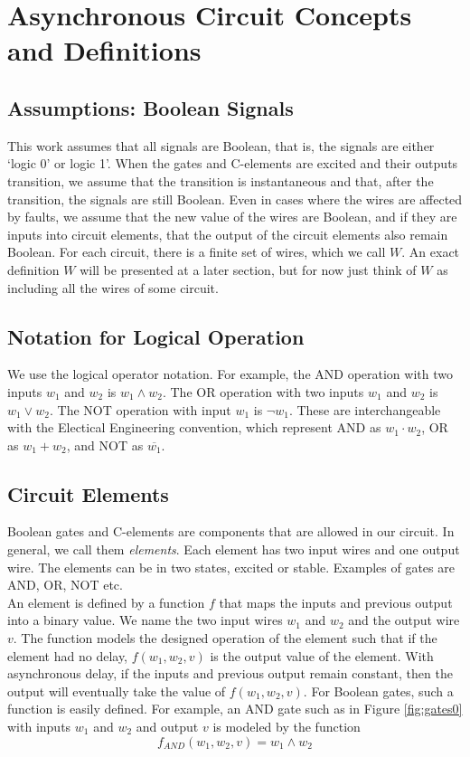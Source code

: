 \documentclass[12pt]{report}
\begin{document}
\chapter{Asynchronous Circuit Concepts and Definitions}
\section{Assumptions:  Boolean Signals}
This work assumes that all signals are Boolean, that is, the signals are either `logic 0' or logic 1'.  When the gates and C-elements are excited and their outputs transition, we assume that the transition is instantaneous and that, after the transition, the signals are still Boolean.   
Even in cases where the wires are affected by faults, we assume that the new value of the wires are Boolean, and if they are inputs into circuit elements, that the output of the circuit elements also remain Boolean.  For each circuit, there is a finite set of wires, which we call $W$.  An exact definition $W$ will be presented at a later section, but for now just think of $W$ as including all the wires of some circuit.

\section{Notation for Logical Operation}
We use the logical operator notation.  For example, the AND operation with two inputs $w_1$ and $w_2$ is $w_1\wedge w_2$.
The OR operation with two inputs $w_1$ and $w_2$ is $w_1\vee w_2$.  The NOT operation with input $w_1$ is $\neg w_1$.  These are interchangeable with the Electical Engineering convention, which represent AND as $w_1\cdot w_2$, OR as $w_1+w_2$, and NOT as $\overline{w_1}$.

\section{Circuit Elements}
Boolean gates and C-elements are components that are allowed in our circuit.  In general, we call them {\em elements}.  Each element has two input wires and one output wire.  The elements can be in two states, excited or stable.  Examples of gates are AND, OR, NOT etc.\\

An element is defined by a function $f$ that maps the inputs and previous output into a binary value.  We name the two input wires $w_1$ and $w_2$ and the output wire $v$.  The function models the designed operation of the element such that if the element had no delay, $f(w_1,w_2, v)$ is the output value of the element.  With asynchronous delay, if the inputs and previous output remain constant, then the output will eventually take the value of $f(w_1,w_2, v)$.  For Boolean gates, such a function is easily defined.    
For example, an AND gate such as in Figure \ref{fig:gates0} with inputs $w_1$ and $w_2$ and output $v$ is modeled by the function 
\[
f_{AND}(w_1,w_2,v)= w_1\wedge w_2
\]
\end{document}
